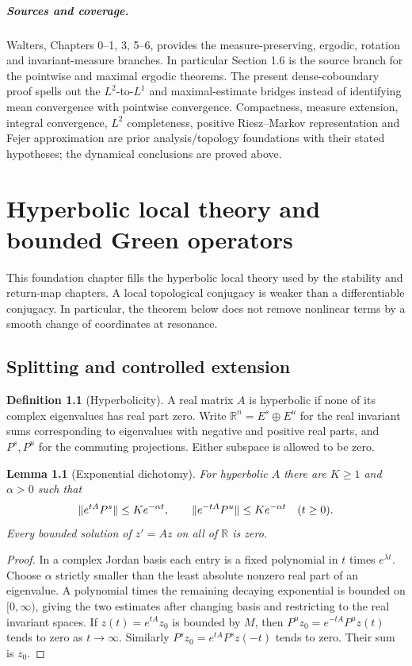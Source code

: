 \documentclass[11pt,oneside]{book}
\newtheorem{lemma}[theorem]{Lemma}
\theoremstyle{definition}
\newtheorem{definition}[theorem]{Definition}
\theoremstyle{remark}\newtheorem{remark}[theorem]{Remark}
\newcommand{\R}{\mathbb R}\newcommand{\C}{\mathbb C}
\begin{document}
\paragraph{Sources and coverage.}
Walters, Chapters 0--1, 3, 5--6, provides the measure-preserving,
ergodic, rotation and invariant-measure branches. In particular
Section 1.6 is the source branch for the pointwise and maximal
ergodic theorems. The present dense-coboundary proof spells out
the \(L^2\)-to-\(L^1\) and maximal-estimate bridges instead of
identifying mean convergence with pointwise convergence.
Compactness, measure extension, integral convergence, \(L^2\)
completeness, positive Riesz--Markov representation and Fejer
approximation are prior analysis/topology foundations with their
stated hypotheses; the dynamical conclusions are proved above.



\chapter{Hyperbolic local theory and bounded Green operators}
\label{ch:d13-20}

This foundation chapter fills the hyperbolic local theory used by the
stability and return-map chapters. A local topological conjugacy is weaker
than a differentiable conjugacy. In particular, the theorem below does not
remove nonlinear terms by a smooth change of coordinates at resonance.

\section{Splitting and controlled extension}
\begin{definition}[Hyperbolicity]\label{d13:20:hyperbolicity}
A real matrix $A$ is hyperbolic if none of its complex eigenvalues has real
part zero. Write $\R^n=E^s\oplus E^u$ for the real invariant sums corresponding
to eigenvalues with negative and positive real parts, and $P^s,P^u$ for the
commuting projections. Either subspace is allowed to be zero.
\end{definition}

\begin{lemma}[Exponential dichotomy]\label{d13:20:dichotomy}
For hyperbolic $A$ there are $K\geq1$ and $\alpha>0$ such that
\[
 \lVert e^{tA}P^s\rVert\leq Ke^{-\alpha t},\qquad
 \lVert e^{-tA}P^u\rVert\leq Ke^{-\alpha t}\quad(t\geq0).
\]
Every bounded solution of $z'=Az$ on all of $\R$ is zero.
\end{lemma}
\begin{proof}
In a complex Jordan basis each entry is a fixed polynomial in $t$ times
$e^{\lambda t}$. Choose $\alpha$ strictly smaller than the least absolute
nonzero real part of an eigenvalue. A polynomial times the remaining
decaying exponential is bounded on $[0,\infty)$, giving the two estimates
after changing basis and restricting to the real invariant spaces.
If $z(t)=e^{tA}z_0$ is bounded by $M$, then
$P^u z_0=e^{-tA}P^u z(t)$ tends to zero as $t\to\infty$.
Similarly $P^s z_0=e^{tA}P^s z(-t)$ tends to zero. Their sum is $z_0$.
\end{proof}
\end{document}
